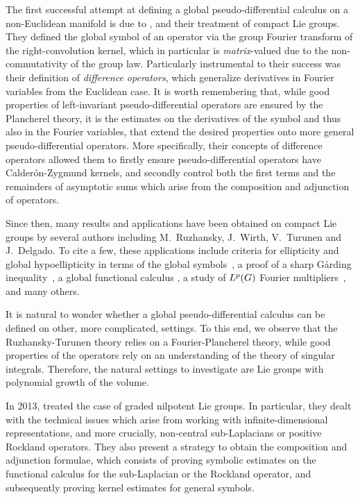 The first successful attempt at defining a global pseudo-differential calculus
on a non-Euclidean manifold is due to \citeauthor{RuzhanskyTurunen10},
and their treatment of compact Lie groups.
They defined the global symbol of an operator via the group Fourier transform of the right-convolution kernel,
which in particular is  \emph{matrix}-valued
due to the non-commutativity of the group law.
Particularly instrumental to their success was their definition of \emph{difference operators},
which generalize derivatives in Fourier variables from the Euclidean case.
It is worth remembering that,
while good properties of left-invariant pseudo-differential operators
are ensured by the Plancherel theory,
it is the estimates on the derivatives of the symbol and thus also in the Fourier variables,
that extend the desired properties onto more general pseudo-differential operators.
More specifically,
their concepts of difference operators allowed them to firstly ensure pseudo-differential operators
have Calder\'on-Zygmund kernels,
and secondly control both the first terms and the remainders of asymptotic sums
which arise from the composition and adjunction of operators.

Since then,
many results and applications have been obtained on compact Lie groups
by several authors including M.\ Ruzhansky, J.\ Wirth, V.\ Turunen and J.\ Delgado.
To cite a few,
these applications include
criteria for ellipticity and global hypoellipticity in terms of the global symbols~\cite{RuzhanskyTurunen10},
a proof of a sharp Gårding inequality~\cite{RuzhanskyTurunen11},
a global functional calculus \cite{RuzhanskyWirth14},
a study of ${L^{p} (G)}$ Fourier multipliers~\cite{RuzhanskyWirth15},
and many others.

It is natural to wonder whether a global pseudo-differential calculus can be defined on other,
more complicated, settings.
To this end,
we observe that the Ruzhansky-Turunen theory relies on a Fourier-Plancherel theory,
while good properties of the operators rely on an understanding of the theory of singular integrals.
Therefore,
the natural settings to investigate are Lie groups with polynomial growth of the volume.

In 2013,
\citeauthor{FischerRuzhansky12} treated the case of graded nilpotent Lie groups.
In particular,
they dealt with the technical issues which arise from working with infinite-dimensional representations,
and more crucially,
non-central sub-Laplacians or positive Rockland operators.
They also present a strategy to obtain the composition and adjunction formulae,
which consists of proving symbolic estimates on the functional calculus for the sub-Laplacian or the Rockland operator,
and subsequently proving kernel estimates for general symbols.


